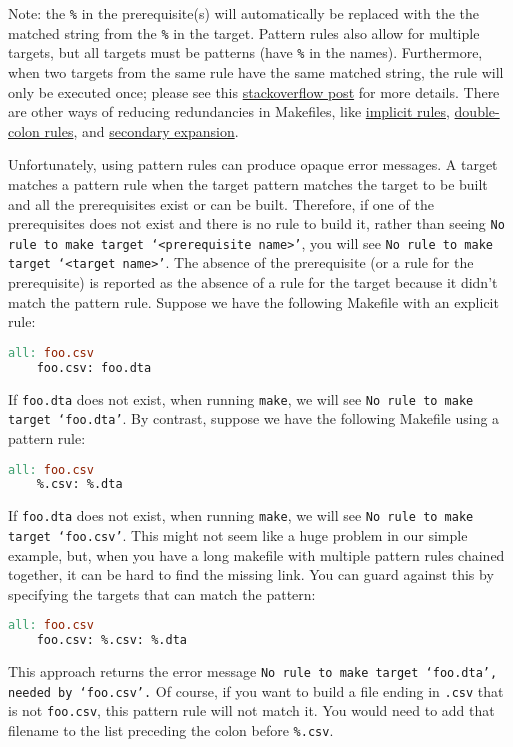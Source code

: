 Note: the \texttt{\%} in the prerequisite(s) will automatically be
	replaced with the the matched string from the \texttt{\%} in the target.
Pattern rules also allow for multiple targets,
	but all targets must be patterns
	(have \texttt{\%} in the names).
Furthermore, when two targets from the same rule have the same matched string,
	the rule will only be executed once;
	please see this
	\href{https://stackoverflow.com/questions/13945091/make-error-of-mixed-implicit-and-normal-rules}{stackoverflow post}
	for more details.
There are other ways of reducing redundancies in Makefiles,
	like \href{https://www.gnu.org/software/make/manual/html_node/Implicit-Rules.html#Implicit-Rules}{implicit rules},
	\href{https://www.gnu.org/software/make/manual/html_node/Double_002dColon.html}{double-colon rules},
	and \href{https://www.gnu.org/software/make/manual/html_node/Secondary-Expansion.html}{secondary expansion}.

Unfortunately, using pattern rules can produce opaque error messages.
A target matches a pattern rule when the target pattern matches the target to be built
and
all the prerequisites exist or can be built.
Therefore, if one of the prerequisites does not exist
	and there is no rule to build it,
	rather than seeing \texttt{No rule to make target `<prerequisite name>'},
	you will see \texttt{No rule to make target `<target name>'}.
The absence of the prerequisite (or a rule for the prerequisite) is reported
	as the absence of a rule for the target because it didn't match the pattern rule.
Suppose we have the following Makefile with an explicit rule:
\begin{lstlisting}[language=make]
	all: foo.csv
	foo.csv: foo.dta
\end{lstlisting}
If \texttt{foo.dta} does not exist, when running \texttt{make},
	we will see \texttt{No rule to make target `foo.dta'}.
By contrast, suppose we have the following Makefile using a pattern rule:
\begin{lstlisting}[language=make]
	all: foo.csv
	%.csv: %.dta
\end{lstlisting}
If \texttt{foo.dta} does not exist, when running \texttt{make},
	we will see \texttt{No rule to make target `foo.csv'}.
This might not seem like a huge problem in our simple example,
	but, when you have a long makefile with multiple pattern rules chained together,
	it can be hard to find the missing link.
You can guard against this by specifying the targets that can match the pattern:
\begin{lstlisting}[language=make]
	all: foo.csv
	foo.csv: %.csv: %.dta
\end{lstlisting}
This approach returns the error message \texttt{No rule to make target `foo.dta', needed by `foo.csv'.}
Of course, if you want to build a file ending in \texttt{.csv} that is not \texttt{foo.csv},
	this pattern rule will not match it.
You would need to add that filename to the list preceding the colon before \texttt{\%.csv}.

